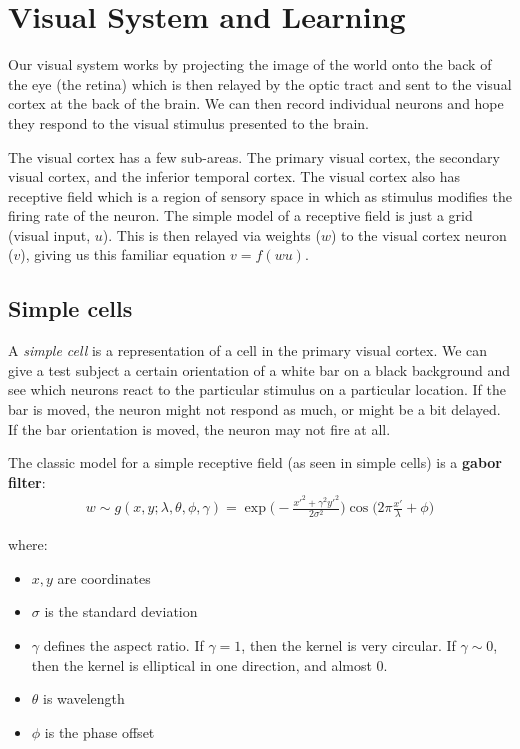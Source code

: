\documentclass[11pt,a4paper,titlepage,dvipsnames,cmyk]{scrartcl}
\begin{document}
\section{Visual System and Learning}
Our visual system works by projecting the image of the world onto the back of the eye (the retina) which is then relayed by the optic tract and sent to the visual cortex at the back of the brain. We can then record individual neurons and hope they respond to the visual stimulus presented to the brain.

The visual cortex has a few sub-areas. The primary visual cortex, the secondary visual cortex, and the inferior temporal cortex. The visual cortex also has receptive field which is a region of sensory space in which as stimulus modifies the firing rate of the neuron. The simple model of a receptive field is just a grid (visual input, $u$). This is then relayed via weights ($w$) to the visual cortex neuron ($v$), giving us this familiar equation $v = f(wu)$.

\subsection{Simple cells}
A \textit{simple cell} is a representation of a cell in the primary visual cortex. We can give a test subject a certain orientation of a white bar on a black background and see which neurons react to the particular stimulus on a particular location. If the bar is moved, the neuron might not respond as much, or might be a bit delayed. If the bar orientation is moved, the neuron may not fire at all.

The classic model for a simple receptive field (as seen in simple cells) is a \textbf{gabor filter}:
\begin{align*}
w \sim g(x,y;\lambda, \theta, \phi, \gamma) = \exp \bigg ( - \frac{x'^2 + \gamma ^2 y'^2}{2\sigma^2}\bigg) \cos \bigg ( 2\pi \frac{x'}{\lambda} + \phi \bigg)
\end{align*}

where:
\begin{itemize}
    \item $x,y$ are coordinates
    \item $\sigma$ is the standard deviation
    \item $\gamma$ defines the aspect ratio. If $\gamma = 1$, then the kernel is very circular. If $\gamma \sim 0$, then the kernel is elliptical in one direction, and almost 0.
    \item $\theta$ is wavelength
    \item $\phi$ is the phase offset
\end{itemize}
\end{document}
